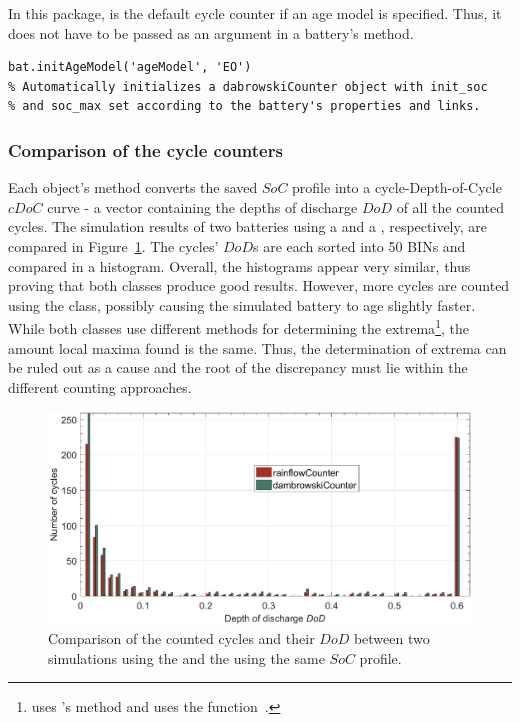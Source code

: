 In this package,  is the default cycle counter if an age model is specified. Thus, it does not have to be passed as an argument in a battery's  method.
\begin{lstlisting}
bat.initAgeModel('ageModel', 'EO')
% Automatically initializes a dabrowskiCounter object with init_soc
% and soc_max set according to the battery's properties and links.
\end{lstlisting}

\subsubsection{Comparison of the cycle counters}
Each  object's  method converts the saved $SoC$ profile into a cycle-Depth-of-Cycle $cDoC$ curve - a vector containing the depths of discharge $DoD$ of all the counted cycles. The simulation results of two batteries using a  and a , respectively, are compared in Figure~\ref{fig:cdoc_hists}. The cycles' $DoD$s are each sorted into 50 BINs and compared in a histogram. Overall, the histograms appear very similar, thus proving that both classes produce good results. However, more cycles are counted using the  class, possibly causing the simulated battery to age slightly faster. While both classes use different methods for determining the extrema\footnote{ uses 's  method and  uses the  function~\cite{_rainflow_????}.}, the amount local maxima found is the same. Thus, the determination of extrema can be ruled out as a cause and the root of the discrepancy must lie within the different counting approaches.
\begin{figure}[t!]
	\captionsetup{type=figure}
	\centering
	\includegraphics[width=\textwidth]{cdoc_hists}
	\caption[Comparison of the counted cycles and their $DoD$ between two simulations using the  and the  using the same $SoC$ profile]{Comparison of the counted cycles and their $DoD$ between two simulations using the  and the  using the same $SoC$ profile.}
	\label{fig:cdoc_hists}
\end{figure}

